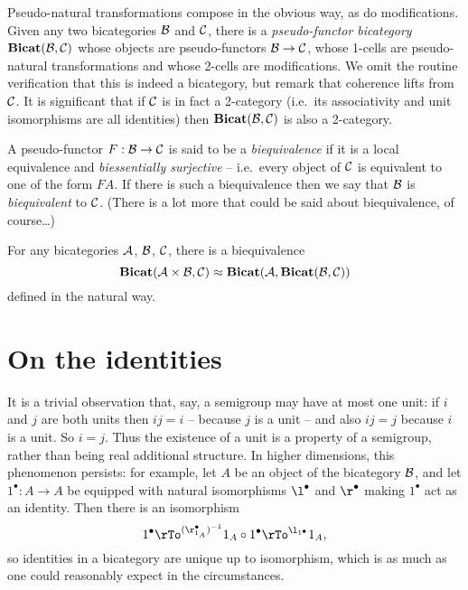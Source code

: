 \documentclass{robinthesisdraft}
\begin{document}
Pseudo-natural transformations compose in the obvious way, as do modifications.
Given any two bicategories $\mathcal{B}$ and $\mathcal{C}$, there is a \emph{pseudo-functor bicategory}
$\mathbf{Bicat}(\mathcal{B},\mathcal{C})$ whose objects are pseudo-functors $\mathcal{B}\to\mathcal{C}$,
whose 1-cells are pseudo-natural transformations and whose
2-cells are modifications. We omit the routine verification that
this is indeed a bicategory, but remark that coherence lifts from
$\mathcal{C}$. It is significant that if $\mathcal{C}$ is in fact a 2-category
(i.e.\ its associativity and unit isomorphisms are all identities) then
$\mathbf{Bicat}(\mathcal{B},\mathcal{C})$ is also a 2-category.

A pseudo-functor $F:\mathcal{B}\to\mathcal{C}$ is said to be a \emph{biequivalence}
if it is a local equivalence and \emph{biessentially surjective} -- i.e.\ every
object of $\mathcal{C}$ is equivalent to one of the form $FA$. If there is such a
biequivalence then we say that $\mathcal{B}$ is \emph{biequivalent} to $\mathcal{C}$.
(There is a lot more that could be said about biequivalence, of course\dots)

For any bicategories $\mathcal{A}$, $\mathcal{B}$, $\mathcal{C}$, there is a biequivalence
\[
	\mathbf{Bicat}(\mathcal{A}\times\mathcal{B}, \mathcal{C}) \approx \mathbf{Bicat}(\mathcal{A}, \mathbf{Bicat}(\mathcal{B},\mathcal{C}))
\]
defined in the natural way.
% 

\section{On the identities}\label{s-identities}
It is a trivial observation that, say, a semigroup may have at
most one unit: if $i$ and $j$ are both units then $ij=i$ -- because
$j$ is a unit -- and also $ij=j$ because $i$ is a unit. So $i=j$.
Thus the existence of a unit is a property of a semigroup, rather
than being real additional structure. In higher dimensions, this
phenomenon persists: for example, let
$A$ be an object of the bicategory $\mathcal{B}$, and let $1^\bullet: A\to A$
be equipped with natural isomorphisms $\l^{\bullet}$ and $\r^{\bullet}$
making $1^{\bullet}$ act as an identity. Then there is an isomorphism
\[
	1^{\bullet} \rTo^{(\r^{\bullet}_{1_{A}})^{-1}} 1_{A}\o 1^{\bullet}
		\rTo^{\l_{1^{\bullet}}} 1_{A},
\]
so identities in a bicategory are unique up to isomorphism, which
is as much as one could reasonably expect in the circumstances.
\end{document}
